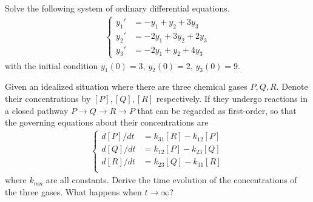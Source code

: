 \begin{Exercise}
Solve the following system of ordinary differential equations.
\begin{align*}
\begin{cases}
y_1' &= -y_1 + y_2 + 3y_3\\
y_2' &= -2y_1 + 3y_2 + 2y_3\\
y_3' &= -2y_1 + y_2 + 4y_3
\end{cases}
\end{align*}
with the initial condition $y_1(0) = 3$, $y_2(0) = 2$, $y_3(0) = 9$.
\end{Exercise}

\begin{Exercise}
Given an idealized situation where there are three chemical gases $P, Q, R$. Denote their concentrations by $[P], [Q], [R]$ respectively. If they undergo reactions in a closed pathway $P \to Q \to R \to P$ that can be regarded as first-order, so that the governing equations about their concentrations are
\begin{align*}
\begin{cases}
d[P]/dt &= k_{31}[R] - k_{12}[P] \\
d[Q]/dt &= k_{12}[P] - k_{23}[Q] \\
d[R]/dt &= k_{23}[Q] - k_{31}[R] \\
\end{cases}
\end{align*}
where $k_{mn}$ are all constants. Derive the time evolution of the concentrations of the three gases. What happens when $t \to \infty$?
\end{Exercise}